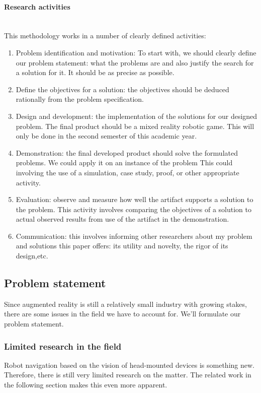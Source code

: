 \documentclass{article}
\begin{document}
\paragraph{Research activities}\mbox{}\\
This methodology works in a number of clearly defined activities:
\begin{enumerate}[wide=0pt]
\item Problem identification and motivation: To start with, we should clearly	define our problem statement: what the problems are and also justify the search for a solution for it. It should be as precise as possible.

\item Define the objectives for a solution: the objectives
should be deduced rationally from the problem specification.

\item Design and development: the implementation of the solutions for our designed problem. The final product should be a mixed reality robotic game. This will only be done in the second semester of this academic year.

\item Demonstration: the final developed product should solve the formulated problems. We could apply it on an instance of the problem This could involving the use of a simulation, case study, proof, or other appropriate activity.

\item Evaluation: observe and measure how well the artifact supports a
solution to the problem. This activity involves comparing the objectives of a
solution to actual observed results from use of the artifact in the demonstration.

\item Communication: this involves informing other researchers about my problem and solutions this paper offers: its utility and novelty, the rigor of its design,etc.
\end{enumerate}


\subsection{Problem statement}
Since augmented reality is still a relatively small industry with growing stakes, there are some issues in the field we have to account for. We'll formulate our problem statement.

\subsubsection{Limited research in the field}
Robot navigation based on the vision of head-mounted devices is something new. Therefore, there is still very limited research on the matter. The related work in the following section makes this even more apparent.
\end{document}
